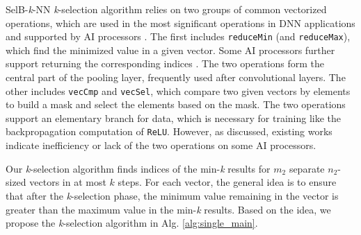 SelB-\textit{k}-NN \textit{k}-selection algorithm relies on two groups of common vectorized operations, which are used in the most significant operations in DNN applications and supported by AI processors \cite{CANN, jax, cambricon}. The first includes \verb|reduceMin| (and \verb|reduceMax|), which find the minimized value in a given vector. Some AI processors further support returning the corresponding indices \cite{CANN}. The two operations form the central part of the pooling layer, frequently used after convolutional layers. The other includes \verb|vecCmp| and \verb|vecSel|, which compare two given vectors by elements to build a mask and select the elements based on the mask. The two operations support an elementary branch for data, which is necessary for training like the backpropagation computation of \verb|ReLU|. However, as discussed, existing works \cite{DBLP:conf/icpp/JiW21, cambricon, CANN} indicate inefficiency or lack of the two operations on some AI processors.

Our \textit{k}-selection algorithm finds indices of the min-\textit{k} results for $m_2$ separate $n_2$-sized vectors in at most $k$ steps. For each vector, the general idea is to ensure that after the \textit{k}-selection phase, the minimum value remaining in the vector is greater than the maximum value in the min-\textit{k} results. Based on the idea, we propose the \textit{k}-selection algorithm in Alg. \ref{alg:single_main}.

